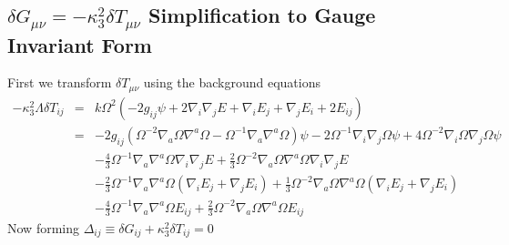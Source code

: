 \documentclass[10pt,letterpaper]{article}
\numberwithin{equation}{section}
\begin{document}
\subsection{$\delta G_{\mu\nu} = -\kappa^2_3 \delta T_{\mu\nu}$ Simplification to Gauge Invariant Form}
First we transform $\delta T_{\mu\nu}$ using the background equations
\begin{eqnarray}
-\kappa^2_3 \Lambda \delta T_{ij} &=& k\Omega^2 (-2g_{ij}\psi + 2\nabla_i\nabla_j E + \nabla_i E_j
+\nabla_j E_i + 2E_{ij})
\nonumber\\
&=& -2 g_{ij}( \Omega^{-2} \nabla_{a}\Omega \nabla^{a}\Omega -\Omega^{-1} \nabla_{a}\nabla^{a}\Omega)\psi -2  \Omega^{-1} \nabla_{i}\nabla_{j}\Omega\psi + 4 \Omega^{-2} \nabla_{i}\Omega \nabla_{j}\Omega \psi
\nonumber\\
&&-\tfrac{4}{3} \Omega^{-1}\nabla_a \nabla^a \Omega \nabla_i\nabla_j E + \tfrac{2}{3}\Omega^{-2}\nabla_a\Omega \nabla^a\Omega\nabla_i\nabla_j E
\nonumber\\
&&-\tfrac{2}{3} \Omega^{-1}\nabla_a \nabla^a \Omega (\nabla_i E_j + \nabla_j E_i) + \tfrac{1}{3}\Omega^{-2}\nabla_a\Omega \nabla^a\Omega (\nabla_i E_j + \nabla_j E_i)
\nonumber\\
&&
-\tfrac{4}{3} \Omega^{-1}\nabla_a \nabla^a \Omega E_{ij} + \tfrac{2}{3}\Omega^{-2}\nabla_a\Omega \nabla^a\Omega E_{ij}
\end{eqnarray}
Now forming $\Delta_{ij} \equiv \delta G_{ij} + \kappa^2_3\delta T_{ij} = 0$
\end{document}
